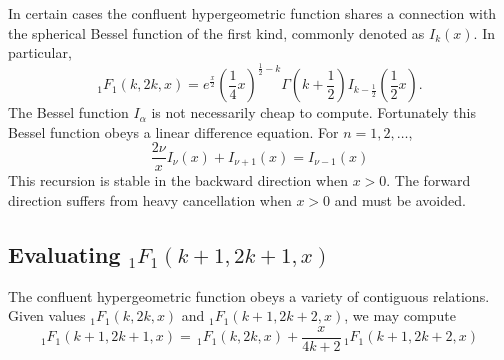\documentclass{article}
\begin{document}
In certain cases the confluent hypergeometric function shares a connection 
with the spherical Bessel function of the first kind, commonly denoted 
as $I_k(x)$. In particular,
\begin{equation*}
  _1F_1(k, 2k, x) = e^{\frac{x}{2}}\left(\frac{1}{4}x\right)^{\frac{1}{2} - k}
\Gamma\left(k + \frac{1}{2}\right)I_{k-\frac{1}{2}}\left(\frac{1}{2}x\right).
\end{equation*}
The Bessel function $I_\alpha$ is not necessarily cheap to compute. Fortunately 
this Bessel function obeys a linear difference equation. For $n = 1, 2, \ldots$,
\begin{equation*}
\frac{2\nu}{x}I_\nu(x) + I_{\nu + 1}(x) = I_{\nu - 1}(x)
\end{equation*}
This recursion is stable in the backward direction when $x > 0$. The forward direction 
suffers from heavy cancellation when $x > 0$ and must be avoided.
\subsection*{Evaluating $_1F_1(k + 1, 2k + 1, x)$}
The confluent hypergeometric function obeys a variety of contiguous relations. Given values
$_1F_1(k, 2k, x)$ and $_1F_1(k + 1, 2k + 2, x)$, we may compute
\begin{equation*}
  _1F_1(k + 1, 2k + 1, x) = \,_1F_1(k, 2k, x) + \frac{x}{4k + 2}\,_1F_1(k + 1, 2k + 2, x)
\end{equation*}
\end{document}
